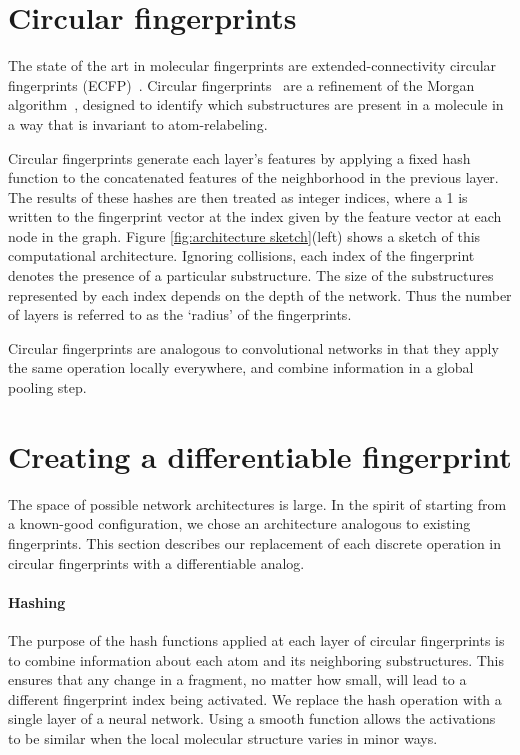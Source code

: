 \documentclass{article}
\newcommand{\citep}{\cite}
\begin{document}
\section{Circular fingerprints}
\vspace{-3mm}
The state of the art in molecular fingerprints are extended-connectivity circular fingerprints (ECFP)~\citep{ECFP2010}.
Circular fingerprints~\citep{glem2006circular} are a refinement of the Morgan algorithm~\citep{morgan1965generation}, designed to identify which substructures are present in a molecule in a way that is invariant to atom-relabeling.

Circular fingerprints generate each layer's features by applying a fixed hash function to the concatenated features of the neighborhood in the previous layer.
The results of these hashes are then treated as integer indices, where a 1 is written to the fingerprint vector at the index given by the feature vector at each node in the graph.
Figure \ref{fig:architecture sketch}(left) shows a sketch of this computational architecture.
Ignoring collisions, each index of the fingerprint denotes the presence of a particular substructure.
The size of the substructures represented by each index depends on the depth of the network.
Thus the number of layers is referred to as the `radius' of the fingerprints.


Circular fingerprints are analogous to convolutional networks in that they apply the same operation locally everywhere,  and combine information in a global pooling step.

\section{Creating a differentiable fingerprint}
\vspace{-3mm}
The space of possible network architectures is large.
In the spirit of starting from a known-good configuration, we chose an architecture analogous to existing fingerprints.
This section describes our replacement of each discrete operation in circular fingerprints with a differentiable analog.

\paragraph{Hashing}
The purpose of the hash functions applied at each layer of circular fingerprints is to combine information about each atom and its neighboring substructures.
This ensures that any change in a fragment, no matter how small, will lead to a different fingerprint index being activated.
We replace the hash operation with a single layer of a neural network.
Using a smooth function allows the activations to be similar when the local molecular structure varies in minor ways.
\end{document}
